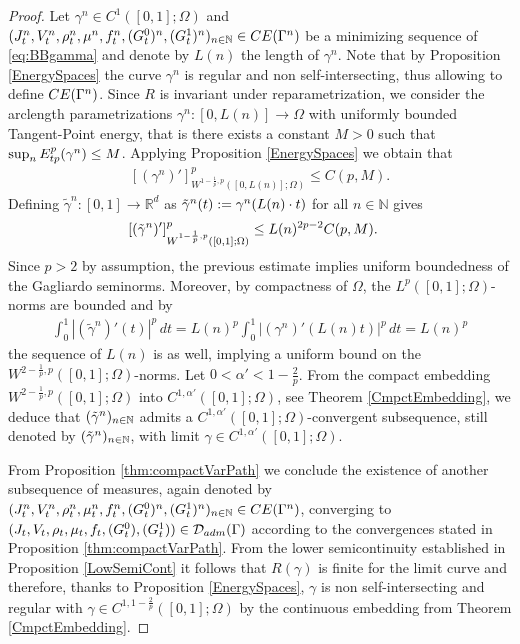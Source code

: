 \documentclass[10pt,a4paper]{amsart}
\def\R{{\mathbb R}}
\begin{document}
\begin{proof}   
    Let $\gamma^n \in C^{1}([0,1];\Omega)$ and $(J_t^n, V_t^n, \rho_t^n, \mu^n, f_t^n, (G_t^0)^n, (G_t^1)^n)_{n\in\mathbb{N}} \in {\rm CE}(\Gamma^n)$ be a minimizing sequence of \eqref{eq:BBgamma} and denote by $L(n)$ the length of $\gamma^n$. Note that by Proposition \ref{EnergySpaces} the curve $\gamma^n$ is regular and non self-intersecting, thus allowing to define ${\rm CE}(\Gamma^n)$.
    Since $R$ is invariant under reparametrization, we consider the arclength parametrizations $\gamma^n: [0,L(n)]\to\Omega$ with uniformly bounded Tangent-Point energy, that is there exists a constant $M>0$ such that $\sup_n E_{\rm tp}^p(\gamma^n) \leq M$.
    Applying Proposition \ref{EnergySpaces} we obtain that \begin{align}\label{eq:estimate2}
        [(\gamma^n)']^p_{W^{1 - \frac{1}{p}, p}([0,L(n)];\Omega)} \leq C(p,M).
    \end{align} 
    Defining $\tilde \gamma^n : [0,1]\to\R^d$ as $\Tilde{\gamma}^n(t) := \gamma^n(L(n)\cdot t)$ for all $n\in\mathbb{N}$ gives
    \begin{align}\label{eq:secone}
        [ (\Tilde{\gamma}^n)']^p_{W^{1-\frac{1}{p},p}([0,1];\Omega)} &\leq L(n)^{2p-2}C(p,M).
    \end{align}
    Since $p>2$ by assumption, the previous estimate implies uniform boundedness of the Gagliardo seminorms. 
    Moreover, by compactness of $\Omega$, the $L^p([0,1];\Omega)$-norms are bounded and by
    \begin{align}
    \int_0^1 |(\tilde \gamma^n)'(t)|^p\, dt =  L(n)^p \int_0^1 | (\gamma^n)'(L(n)t)|^p\, dt = L(n)^p  
    \end{align}
    the sequence of $L(n)$ is as well, implying a uniform bound on the $W^{2-\frac{1}{p},p}([0,1];\Omega)$-norms. 
    Let $0<\alpha'<1-\frac{2}{p}$. From the compact embedding $W^{2-\frac{1}{p},p}([0,1];\Omega)$ into $C^{1,\alpha'}([0,1];\Omega)$, see Theorem \ref{CmpctEmbedding}, we deduce that $(\Tilde{\gamma}^n)_{n\in\mathbb{N}}$ admits a $C^{1,\alpha'}([0,1];\Omega)$-convergent subsequence, still denoted by $(\Tilde{\gamma}^n)_{n\in\mathbb{N}}$, with limit $\gamma \in C^{1,\alpha'}([0,1];\Omega)$.

    
    From Proposition \ref{thm:compactVarPath} we conclude the existence of another subsequence of measures, again denoted by $(J_t^n, V_t^n, \rho_t^n, \mu_t^n, f_t^n, ({G_t^0})^n, ({G_t^1})^n)_{n\in\mathbb{N}} \in {\rm CE}(\Gamma^n)$, converging to $(J_t, V_t, \rho_t, \mu_t, f_t, ({G_t^0}), ({G_t^1})) \in \mathcal{D}_{\rm adm}(\Gamma)$ according to the convergences stated in Proposition \ref{thm:compactVarPath}. 
    From the lower semicontinuity established in Proposition \ref{LowSemiCont} it follows that $R(\gamma)$ is finite for the limit curve and therefore, thanks to Proposition \ref{EnergySpaces}, $\gamma$ is non self-intersecting and regular with $\gamma\in C^{1,1-\frac{2}{p}}([0,1];\Omega)$ by the continuous embedding from Theorem \ref{CmpctEmbedding}.
    

\end{proof}
\end{document}
